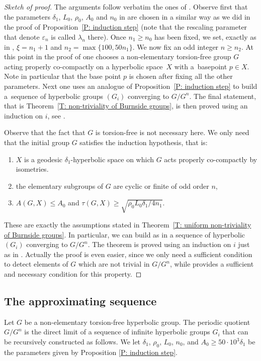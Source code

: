 \documentclass[11pt]{article}
\theoremstyle{plain}
\theoremstyle{definition}
\begin{document}
\begin{proof}[Sketch of proof]
The arguments follow verbatim the ones of \cite[\S 4]{coulon_detecting_2018}.
Observe first that the parameters $\delta_1$, $L_0$, $\rho_0$, $A_0$ and $n_0$ in \cite[p.\,797]{coulon_detecting_2018} are chosen in a similar way as we did in the proof of Proposition~\ref{P: induction step} (note that the rescaling parameter that denote $\varepsilon_n$ is called $\lambda_n$ there).
Once $n_1 \geq n_0$ has been fixed, we set, exactly as in \cite[p.\,797]{coulon_detecting_2018}, $\xi = n_1 + 1$ and $n_2 = \max\{100, 50n_1\}$.
We now fix an odd integer $n \geq n_2$.
At this point in the proof of \cite{coulon_detecting_2018} one chooses a non-elementary torsion-free group $G$ acting properly co-compactly on a hyperbolic space~$X$ with a~basepoint $p \in X$.
Note in particular that the base point $p$ is chosen after fixing all the other parameters.
Next one uses an analogue of Proposition~\ref{P: induction step} to build a~sequence of hyperbolic groups $(G_i)$ converging to $G/G^n$.
The final statement, that is Theorem~\ref{T: non-triviality of Burnside groups}, is then proved using an induction on $i$, see \cite[Prop.\,4.6]{coulon_detecting_2018}.

Observe that the fact that $G$ is torsion-free is not necessary here.
We only need that the initial group $G$ satisfies the induction hypothesis, that is:
\begin{enumerate}
\item $X$ is a geodesic $\delta_1$-hyperbolic space on which $G$ acts properly co-compactly by isometries.
\item the elementary subgroups of $G$ are cyclic or finite of odd order $n$,
\item $A(G,X)\leqslant A_0$ and $\tau(G,X)\geqslant \sqrt{\rho_0 L_0 \delta_1/4n_1}$.
\end{enumerate}
These are exactly the assumptions stated in Theorem~\ref{T: uniform non-triviality of Burnside groups}.
In particular, we can build as in \cite{coulon_detecting_2018} a sequence of hyperbolic $(G_i)$ converging to $G/G^n$.
The theorem is proved using an induction on $i$ just as in \cite{coulon_detecting_2018}.
Actually the proof is even easier, since we only need a sufficient condition to detect elements of $G$ which are not trivial in $G/G^n$, while \cite{coulon_detecting_2018} provides a sufficient and necessary condition for this property.
\end{proof}

\subsection{The approximating sequence}
Let $G$ be a non-elementary torsion-free hyperbolic group.
The periodic quotient $G/G^n$ is the direct limit of a sequence of infinite hyperbolic groups $G_i$ that can be recursively constructed as follows.
We let $\delta_1$, $\rho_0$, $L_0$, $n_0$, and $A_0 \geq 50\cdot 10^3\delta_1$ be the parameters given by Proposition \ref{P: induction step}.
\end{document}
